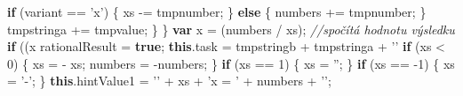 \documentclass[
]{article}
\newenvironment{Shaded}{}{}
\newcommand{\AttributeTok}[1]{\textcolor[rgb]{0.49,0.56,0.16}{#1}}
\newcommand{\CommentTok}[1]{\textcolor[rgb]{0.38,0.63,0.69}{\textit{#1}}}
\newcommand{\ControlFlowTok}[1]{\textcolor[rgb]{0.00,0.44,0.13}{\textbf{#1}}}
\newcommand{\DecValTok}[1]{\textcolor[rgb]{0.25,0.63,0.44}{#1}}
\newcommand{\FloatTok}[1]{\textcolor[rgb]{0.25,0.63,0.44}{#1}}
\newcommand{\KeywordTok}[1]{\textcolor[rgb]{0.00,0.44,0.13}{\textbf{#1}}}
\newcommand{\NormalTok}[1]{#1}
\newcommand{\OperatorTok}[1]{\textcolor[rgb]{0.40,0.40,0.40}{#1}}
\newcommand{\StringTok}[1]{\textcolor[rgb]{0.25,0.44,0.63}{#1}}
\begin{document}
\begin{Shaded}
\begin{Highlighting}[]
                            \ControlFlowTok{if}\NormalTok{ (variant }\OperatorTok{==} \StringTok{'x'}\NormalTok{) }\OperatorTok{\{}
\NormalTok{                                xs }\OperatorTok{-=}\NormalTok{ tmpnumber}\OperatorTok{;}
                            \OperatorTok{\}} \ControlFlowTok{else} \OperatorTok{\{}
\NormalTok{                                numbers }\OperatorTok{+=}\NormalTok{ tmpnumber}\OperatorTok{;}                               
                            \OperatorTok{\}}
\NormalTok{                            tmpstringa }\OperatorTok{+=}\NormalTok{ tmpvalue}\OperatorTok{;}
                        \OperatorTok{\}}
                    \OperatorTok{\}}
                    \KeywordTok{var}\NormalTok{ x }\OperatorTok{=}\NormalTok{ (numbers / xs)}\OperatorTok{;} \CommentTok{//spočítá hodnotu výsledku}
                    \ControlFlowTok{if}\NormalTok{ ((x }\OperatorTok{%
\NormalTok{                        rationalResult }\OperatorTok{=} \KeywordTok{true}\OperatorTok{;}
                        \KeywordTok{this}\NormalTok{.}\AttributeTok{task} \OperatorTok{=}\NormalTok{ tmpstringb }\OperatorTok{+}\NormalTok{ tmpstringa }\OperatorTok{+} \StringTok{'$$'}
                        \ControlFlowTok{if}\NormalTok{ (xs }\OperatorTok{<} \DecValTok{0}\NormalTok{) }\OperatorTok{\{}
\NormalTok{                            xs }\OperatorTok{=} \OperatorTok{-}\NormalTok{ xs}\OperatorTok{;}
\NormalTok{                            numbers }\OperatorTok{=} \OperatorTok{-}\NormalTok{numbers}\OperatorTok{;}
                        \OperatorTok{\}}
                        \ControlFlowTok{if}\NormalTok{ (xs }\OperatorTok{==} \DecValTok{1}\NormalTok{) }\OperatorTok{\{}
\NormalTok{                            xs }\OperatorTok{=} \StringTok{''}\OperatorTok{;}
                        \OperatorTok{\}} 
                        \ControlFlowTok{if}\NormalTok{ (xs }\OperatorTok{==} \DecValTok{-1}\NormalTok{) }\OperatorTok{\{}
\NormalTok{                            xs }\OperatorTok{=} \StringTok{'-'}\OperatorTok{;}
                        \OperatorTok{\}}
                        \KeywordTok{this}\NormalTok{.}\AttributeTok{hintValue1} \OperatorTok{=} \StringTok{'$$'} \OperatorTok{+}\NormalTok{ xs }\OperatorTok{+} \StringTok{'x = '} \OperatorTok{+}\NormalTok{ numbers }\OperatorTok{+} \StringTok{'$$'}\OperatorTok{;}
}
\end{Highlighting}
\end{Shaded}
\end{document}
